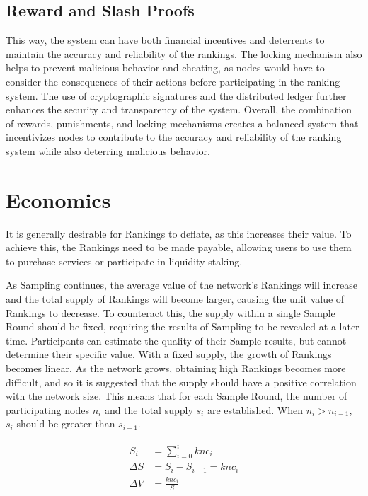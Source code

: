 \documentclass[twocolumn]{article}
\begin{document}
\subsection{Reward and Slash Proofs}

This way, the system can have both financial incentives and deterrents to maintain the accuracy and reliability of the rankings. The locking mechanism also helps to prevent malicious behavior and cheating, as nodes would have to consider the consequences of their actions before participating in the ranking system. The use of cryptographic signatures and the distributed ledger further enhances the security and transparency of the system. Overall, the combination of rewards, punishments, and locking mechanisms creates a balanced system that incentivizes nodes to contribute to the accuracy and reliability of the ranking system while also deterring malicious behavior.

\section{Economics}

It is generally desirable for Rankings to deflate, as this increases their value. To achieve this, the Rankings need to be made payable, allowing users to use them to purchase services or participate in liquidity staking.

As Sampling continues, the average value of the network's Rankings will increase and the total supply of Rankings will become larger, causing the unit value of Rankings to decrease. To counteract this, the supply within a single Sample Round should be fixed, requiring the results of Sampling to be revealed at a later time. Participants can estimate the quality of their Sample results, but cannot determine their specific value. With a fixed supply, the growth of Rankings becomes linear. As the network grows, obtaining high Rankings becomes more difficult, and so it is suggested that the supply should have a positive correlation with the network size. This means that for each Sample Round, the number of participating nodes $n_i$ and the total supply $s_i$ are established. When $n_i > n_{i-1}$, $s_i$ should be greater than $s_{i-1}$.

\begin{figure}[htbp]
  \label{supply}
\begin{align}
  S_i &= \sum_{i=0}^{i}knc_i\\
  \Delta S &= S_i - S_{i-1} = knc_i\\
  \Delta V &= \frac{knc_i}{S}
 \end{align}
\end{figure}
\end{document}
